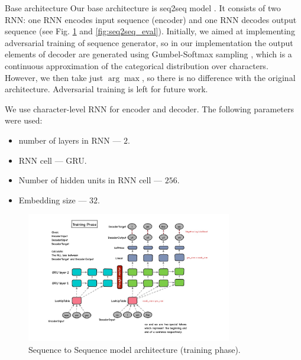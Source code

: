 \documentclass[12pt,a4paper]{article}
\begin{document}
\begin{section}{Base architecture}
Our base architecture is seq2seq model \cite{2015arXiv150605869V}.
It consists of two RNN: one RNN encodes input sequence (encoder) and one RNN decodes output
sequence (see Fig. \ref{fig:seq2seq_train} and \ref{fig:seq2seq_eval}).
Initially, we aimed at implementing adversarial training of sequence generator,
so in our implementation the output elements of decoder are generated using Gumbel-Softmax
sampling \cite{2016arXiv161104051K}, which is a continuous approximation of the categorical
distribution over characters. However, we then take just $\arg \max$, so there is no
difference with the original architecture. Adversarial training is left for future work.

We use character-level RNN for encoder and decoder. The following parameters were used:
\begin{itemize}
    \item number of layers in RNN --- $2$.
    \item RNN cell --- GRU.
    \item Number of hidden units in RNN cell --- $256$.
    \item Embedding size --- $32$.
\end{itemize}

\begin{figure}
    \centering
    \includegraphics[width=0.8\textwidth]{figures/training.png}
    \caption[caption with fn]{Sequence to Sequence model architecture (training phase)\protect\footnotemark.}
    \label{fig:seq2seq_train}
\end{figure}



\end{section}
\end{document}
